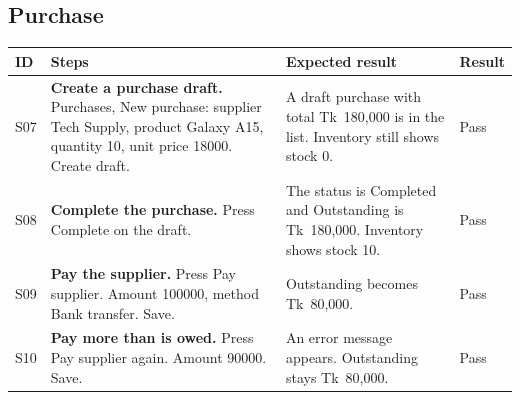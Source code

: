 \documentclass[11pt,a4paper]{article}
\begin{document}
\subsection{Purchase}
\begin{longtable}{@{}P{0.75cm}P{6.0cm}P{5.3cm}P{1.3cm}@{}}
\toprule
\textbf{ID} & \textbf{Steps} & \textbf{Expected result} & \textbf{Result} \\
\midrule
\endhead
S07 & \textbf{Create a purchase draft.} Purchases, New purchase: supplier Tech Supply, product Galaxy A15, quantity 10, unit price 18000. Create draft. & A draft purchase with total Tk~180,000 is in the list. Inventory still shows stock 0. & Pass \\\addlinespace
S08 & \textbf{Complete the purchase.} Press Complete on the draft. & The status is Completed and Outstanding is Tk~180,000. Inventory shows stock 10. & Pass \\\addlinespace
S09 & \textbf{Pay the supplier.} Press Pay supplier. Amount 100000, method Bank transfer. Save. & Outstanding becomes Tk~80,000. & Pass \\\addlinespace
S10 & \textbf{Pay more than is owed.} Press Pay supplier again. Amount 90000. Save. & An error message appears. Outstanding stays Tk~80,000. & Pass \\*
\bottomrule
\end{longtable}

\end{document}
